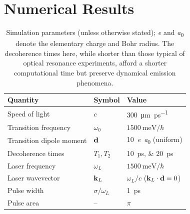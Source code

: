 \section{\label{section:results}Numerical Results}
\begin{table}
  \begin{ruledtabular}
    \begin{tabular}{lll}
      Quantity                 & Symbol            & Value                        \\ \hline
      Speed of light           & $c$               & \SI{300}{\micro\meter \per \pico\second} \\
      Transition frequency     & $\omega_0$        & $\SI{1500}{\milli\eV}/\hbar$ \\
      Transition dipole moment & $\vb{d}$          & \SI{10}{\elementarycharge\bohr} (uniform) \\
      Decoherence times        & $T_{1}, T_{2}$    & \SIlist{10;20}{\pico\second} \\
      Laser frequency          & $\omega_L$        & $\SI{1500}{\milli\eV}/\hbar$ \\
      Laser wavevector         & $\vb{k}_L$        & $\omega_L/c$ ($\vb{k}_L \cdot \vb{d} = 0$) \\
      Pulse width              & $\sigma/\omega_L$ & \SI{1}{\pico\second} \\
      Pulse area               &  --               & $\pi$ \\
    \end{tabular}
  \end{ruledtabular}
  \caption{\label{table:parameters}Simulation parameters (unless otherwise stated); \si{\elementarycharge} and \si{\bohr} denote the elementary charge and Bohr radius.
    The decoherence times here, while shorter than those typical of optical resonance experiments, afford a shorter computational time but preserve dynamical emission phenomena.
  }
\end{table}

